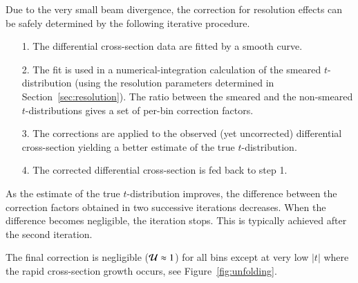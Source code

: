 Due to the very small beam divergence, the correction for resolution effects can be safely determined by the following iterative procedure.
\begin{itemize}
\item[1.] The differential cross-section data are fitted by a smooth curve.
\item[2.] The fit is used in a numerical-integration calculation of the smeared $t$-distribution (using the resolution parameters determined in Section~\ref{sec:resolution}). The ratio between the smeared and the non-smeared $t$-distributions gives a set of per-bin correction factors.
\item[3.] The corrections are applied to the observed (yet uncorrected) differential cross-section yielding a better estimate of the true $t$-distribution.
\item[4.] The corrected differential cross-section is fed back to step 1.
\end{itemize}
As the estimate of the true $t$-distribution improves, the difference between the correction factors obtained in two successive iterations decreases. When the difference becomes negligible, the iteration stops. This is typically achieved after the second iteration. 

The final correction is negligible (${\cal U} \approx 1$) for all bins except at very low $|t|$ where the rapid cross-section growth occurs, see Figure~\ref{fig:unfolding}.

